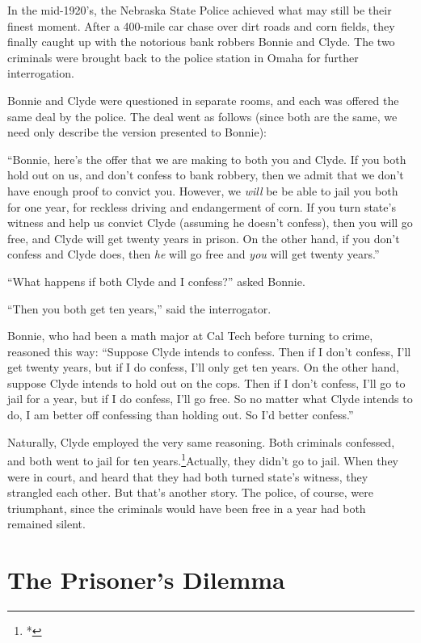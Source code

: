 In the mid-1920's, the Nebraska State Police achieved what may still
be their finest moment. After a 400-mile car chase over dirt roads and
corn fields, they finally caught up with the notorious bank robbers
Bonnie and Clyde. The two criminals were brought back to the police
station in Omaha for further interrogation.

Bonnie and Clyde were questioned in separate rooms, and each was
offered the same deal by the police. The deal went as follows (since
both are the same, we need only describe the version presented to
Bonnie):

``Bonnie, here's the offer that we are making to both you and Clyde.
If you both hold out on us, and don't confess to bank robbery, then we
admit that we don't have enough proof to convict you. However, we {\it
will} be be able to jail you both for one year, for reckless driving
and endangerment of corn. If you turn state's witness and help us
convict Clyde (assuming he doesn't confess), then you will go free,
and Clyde will get twenty years in prison. On the other hand, if you
don't confess and Clyde does, then {\it he} will go free and {\it you}
will get twenty years.''

``What happens if both Clyde and I confess?'' asked Bonnie.

``Then you both get ten years,'' said the interrogator.

Bonnie, who had been a math major at Cal Tech before turning to crime,
reasoned this way: ``Suppose Clyde intends to confess.  Then if I
don't confess, I'll get twenty years, but if I do confess, I'll only
get ten years. On the other hand, suppose Clyde intends to hold out on
the cops. Then if I don't confess, I'll go to jail for a year, but if
I do confess, I'll go free.  So no matter what Clyde intends to do, I
am better off confessing than holding out. So I'd better confess.''


Naturally, Clyde employed the very same reasoning. Both criminals
confessed, and both went to jail for ten years.\footnote{*}{Actually,
they didn't go to jail. When they were in court, and heard that they
had both turned state's witness, they strangled each other.  But
that's another story.} The police, of course, were triumphant, since
the criminals would have been free in a year had both remained silent.


\section{The Prisoner's Dilemma}

